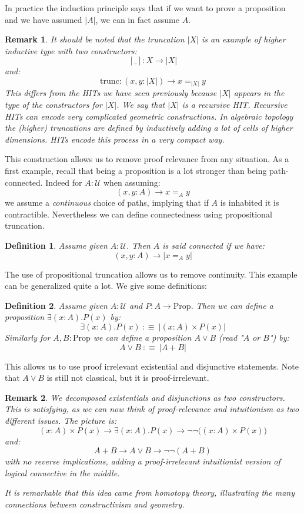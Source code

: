 \documentclass{article}
\newcommand{\U}{{\mathcal U}}
\renewcommand{\r}{\rightarrow}
\newcommand{\Prop}{\mathrm{Prop}}
\newtheorem{definition}{Definition}
\newtheorem{remark}{Remark}
\begin{document}
In practice the induction principle says that if we want to prove a proposition and we have assumed $|A|$, we can in fact assume $A$. 

\begin{remark}
It should be noted that the truncation $|X|$ is an example of higher inductive type with two constructors:
\[[\_] : X\r |X|\]
and: 
\[\mathrm{trunc}: (x,y:|X|) \r x=_{|X|} y\]
This differs from the HITs we have seen previously because $|X|$ appears in the type of the constructors for $|X|$. We say that $|X|$ is a recursive HIT. Recursive HITs can encode very complicated geometric constructions. In algebraic topology the (higher) truncations are defined by inductively adding a lot of cells of higher dimensions. HITs encode this process in a very compact way.
\end{remark} 


This construction allows us to remove proof relevance from any situation. As a first example, recall that being a proposition is a lot stronger than being path-connected. Indeed for $A:\U$ when assuming:
\[(x,y:A)\r x=_Ay\]
we assume a \emph{continuous} choice of paths, implying that if $A$ is inhabited it is contractible. Nevertheless we can define connectedness using propositional truncation.

\begin{definition}
Assume given $A:\U$. Then $A$ is said connected if we have:
\[(x,y:A)\r |x=_Ay|\]
\end{definition}

The use of propositional truncation allows us to remove continuity. This example can be generalized quite a lot. We give some definitions:

\begin{definition}
Assume given $A:\U$ and $P:A\r \Prop$. Then we can define a proposition $\exists (x:A).P(x)$ by:
\[\exists (x:A). P(x) \ :\equiv\ |(x:A)\times P(x)|\]
Similarly for $A,B:\Prop$ we can define a proposition $A\lor B$ (read "$A$ or $B$") by:
\[A\lor B \ :\equiv\ |A+B|\]
\end{definition}

This allows us to use proof irrelevant existential and disjunctive statements. Note that $A\lor B$ is still not classical, but it is proof-irrelevant. 

\begin{remark}
We decomposed existentials and disjunctions as two constructors. This is satisfying, as we can now think of proof-relevance and intuitionism as two different issues. The picture is:
\[(x:A)\times P(x) \r \exists(x:A).P(x)\r \lnot\lnot\big((x:A)\times P(x)\big)\]
and: 
\[A+B \r A\lor B \r \lnot\lnot(A+B)\]
with no reverse implications, adding a \emph{proof-irrelevant intuitionist} version of logical connective in the middle. 

It is remarkable that this idea came from homotopy theory, illustrating the many connections between constructivism and geometry.
\end{remark}
\end{document}

